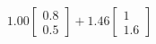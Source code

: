 \documentclass[preview]{standalone}
\begin{document}
\begin{align*}
1.00 \begin{bmatrix} 0.8 \\ 0.5 \end{bmatrix} + 1.46 \begin{bmatrix} 1 \\ 1.6 \end{bmatrix}
\end{align*}
\end{document}
